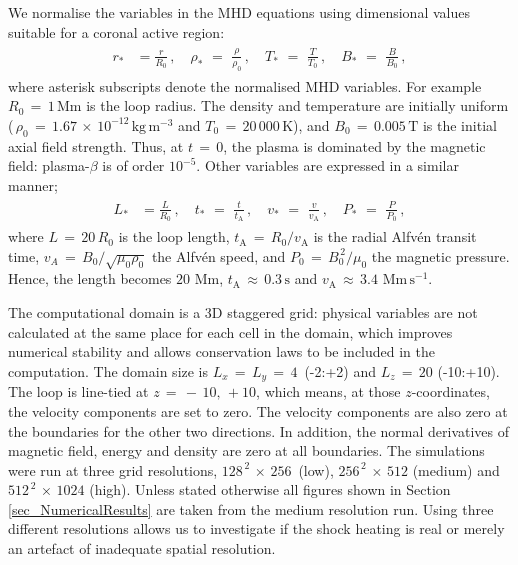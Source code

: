 \documentclass{./packages/rs/rsproca}
\begin{document}
We normalise the variables in the MHD equations using dimensional values suitable for a coronal active region:
\begin{align}\begin{split}
r_{\ast} &= \frac{r}{R_0}\,,\,\,\,\,\,\,\rho_{\ast}\,\,=\,\,\frac{\rho}{\rho_0}\,,\,\,\,\,\,\,T_{\ast}\,\,=\,\,\frac{T}{T_0}\,,\,\,\,\,\,\,B_{\ast}\,\,=\,\,\frac{B}{B_0}\,,
\end{split}\end{align}
where asterisk subscripts denote the normalised MHD variables. For example $R_0\,{=}\,1\,\mathrm{Mm}$ is the loop radius. The density and temperature are initially uniform ($\,\rho_0\,{=}\,1.67\,{\times}\,10^{-12}\,\mathrm{kg}\,\mathrm{m}^{-3}$ and $T_0\,{=}\,20\,000\,\mathrm{K}$), and $B_0\,{=}\,0.005\,\mathrm{T}$ is the initial axial field strength. Thus, at $t\,{=}\,0$, the plasma is dominated by the magnetic field: plasma-$\beta$ is of order $10^{-5}$. Other variables are expressed in a similar manner;
\begin{align}\begin{split}
L_{\ast} &= \frac{L}{R_0}\,,\,\,\,\,\,\,t_{\ast}\,\,=\,\,\frac{t}{t_{\mathrm{A}}}\,,\,\,\,\,\,\,v_{\ast}\,\,=\,\,\frac{v}{v_{\mathrm{A}}}\,,\,\,\,\,\,\,P_{\ast}\,\,=\,\,\frac{P}{P_0}\,,
\end{split}\end{align}
where ${L}\,{=}\,20\,R_0$ is the loop length, $t_{\mathrm{A}}\,{=}\,R_0/v_{\mathrm{A}}$ is the radial Alfv{\'e}n transit time, $v_{A}\,{=}\,B_0/\sqrt{\mu_0\rho_0}$ the Alfv{\'e}n speed, and $P_0\,{=}\,B_0^{\,2}/\mu_0$ the magnetic pressure. Hence, the length becomes $20\,\,\mathrm{Mm}$, $t_{\mathrm{A}}\,{\approx}\,0.3\,\mathrm{s}$ and $v_{\mathrm{A}}\,{\approx}\,3.4\,\,\mathrm{Mm}\,\mathrm{s}^{-1}$. 

The computational domain is a 3D staggered grid: physical variables are not calculated at the same place for each cell in the domain, which improves numerical stability and allows conservation laws to be included in the computation. The domain size is \mbox{$L_x\,{=}\,L_y\,{=}\,4$ (-2:+2)} and $L_z\,{=}\,20$ (-10:+10). The loop is line-tied at $z\,{=}\,{-}\,10,\,+10$, which means, at those $z$-coordinates, the velocity components are set to zero. The velocity components are also zero at the boundaries for the other two directions. In addition, the normal derivatives of magnetic field, energy and density are zero at all boundaries. The simulations were run at three grid resolutions, \mbox{$128^{\,2}\,{\times}\,256$ (low)}, $256^{\,2}\,{\times}\,512$ (medium) and $512^{\,2}\,{\times}\,1024$ (high). Unless stated otherwise all figures shown in Section \ref{sec_NumericalResults} are taken from the medium resolution run. Using three different resolutions allows us to investigate if the shock heating is real or merely an artefact of inadequate spatial resolution.
\end{document}
